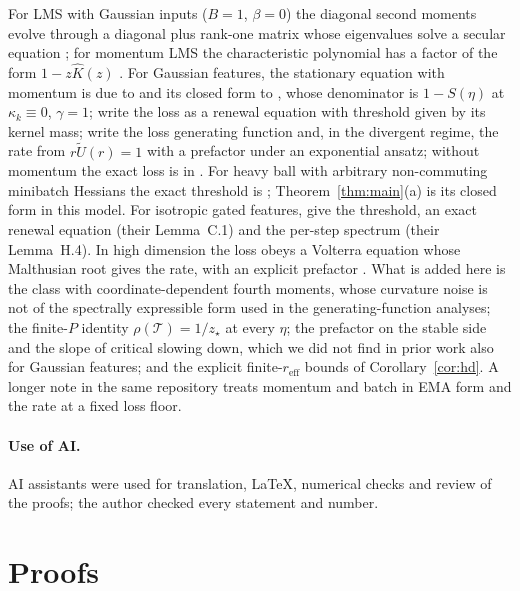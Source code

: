 \documentclass[11pt]{article}
\newcommand{\T}{\mathcal T}
\begin{document}
For LMS with Gaussian inputs ($B=1$, $\beta=0$) the diagonal second moments evolve through a diagonal plus rank-one matrix whose eigenvalues solve a secular equation \citep{feuer1985convergence}; for momentum LMS the characteristic polynomial has a factor of the form $1-z\widehat K(z)$ \citep{roy1990momentum}. For Gaussian features, the stationary equation with momentum is due to \citet{liu2021noise} and its closed form to \citet[Theorem~2]{ziyin2022strength}, whose denominator is $1-S(\eta)$ at $\kappa_k\equiv0$, $\gamma=1$; \citet[Appendix~B]{wang2026momentum} write the loss as a renewal equation with threshold given by its kernel mass; \citet{velikanov2023view} write the loss generating function and, in the divergent regime, the rate from $r\widetilde U(r)=1$ with a prefactor under an exponential ansatz; without momentum the exact loss is in \citet{bordelon2022learning}. For heavy ball with arbitrary non-commuting minibatch Hessians the exact threshold is \citet[Theorem~F.1]{cai2026llm}; Theorem~\ref{thm:main}(a) is its closed form in this model. For isotropic gated features, \citet{everett2026sparse} give the threshold, an exact renewal equation (their Lemma~C.1) and the per-step spectrum (their Lemma~H.4). In high dimension the loss obeys a Volterra equation whose Malthusian root gives the rate, with an explicit prefactor \citep{paquette2021sgd,paquette2021momentum,lee2022minibatch}. What is added here is the class with coordinate-dependent fourth moments, whose curvature noise is not of the spectrally expressible form used in the generating-function analyses; the finite-$P$ identity $\rho(\T)=1/z_\star$ at every $\eta$; the prefactor on the stable side and the slope of critical slowing down, which we did not find in prior work also for Gaussian features; and the explicit finite-$r_{\mathrm{eff}}$ bounds of Corollary~\ref{cor:hd}. A longer note in the same repository treats momentum and batch in EMA form and the rate at a fixed loss floor.

\paragraph{Use of AI.} AI assistants were used for translation, \LaTeX, numerical checks and review of the proofs; the author checked every statement and number.

\appendix
\section{Proofs}\label{app:proofs}
\begingroup\small
\end{document}
